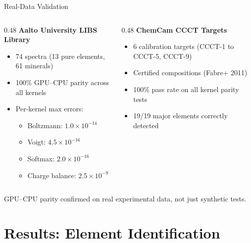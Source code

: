 \documentclass[aspectratio=169,10pt]{beamer}
\begin{document}
\begin{frame}{Real-Data Validation}
	\begin{columns}[T]
		\begin{column}{0.48\textwidth}
			\textbf{Aalto University LIBS Library}
			\begin{itemize}
				\item 74 spectra (13 pure elements, 61 minerals)
				\item \alert{100\% GPU--CPU parity} across all kernels
				\item Per-kernel max errors:
				\begin{itemize}
					\item Boltzmann: $1.0 \times 10^{-14}$
					\item Voigt: $4.5 \times 10^{-16}$
					\item Softmax: $2.0 \times 10^{-16}$
					\item Charge balance: $2.5 \times 10^{-9}$
				\end{itemize}
			\end{itemize}
		\end{column}
		\begin{column}{0.48\textwidth}
			\textbf{ChemCam CCCT Targets}
			\begin{itemize}
				\item 6 calibration targets (CCCT-1 to CCCT-5, CCCT-9)
				\item Certified compositions (Fabre+ 2011)
				\item \alert{100\% pass rate} on all kernel parity tests
				\item 19/19 major elements correctly detected
			\end{itemize}
		\end{column}
	\end{columns}

	\vspace{0.5em}
	\centering
	GPU--CPU parity confirmed on \alert{real experimental data}, not just synthetic tests.
\end{frame}

\section{Results: Element Identification}
\end{document}
